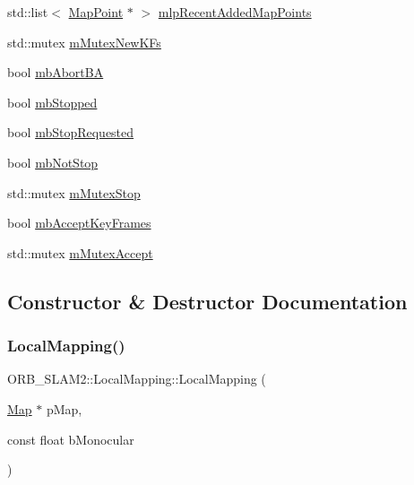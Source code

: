 \begin{DoxyCompactItemize}
\item 
std\+::list$<$ \mbox{\hyperlink{class_o_r_b___s_l_a_m2_1_1_map_point}{Map\+Point}} $\ast$ $>$ \mbox{\hyperlink{class_o_r_b___s_l_a_m2_1_1_local_mapping_afd75991c0499447411a3bd304cc9fa13}{mlp\+Recent\+Added\+Map\+Points}}
\item 
std\+::mutex \mbox{\hyperlink{class_o_r_b___s_l_a_m2_1_1_local_mapping_a970bb666e27d4e801453e9fc26e779a1}{m\+Mutex\+New\+K\+Fs}}
\item 
bool \mbox{\hyperlink{class_o_r_b___s_l_a_m2_1_1_local_mapping_a2d9c44abf1b175880ea418cfc404be87}{mb\+Abort\+BA}}
\item 
bool \mbox{\hyperlink{class_o_r_b___s_l_a_m2_1_1_local_mapping_ada6ab808ccb95293baec4219ac59ca87}{mb\+Stopped}}
\item 
bool \mbox{\hyperlink{class_o_r_b___s_l_a_m2_1_1_local_mapping_af38a9dca4bb96b7ae1711336596a609a}{mb\+Stop\+Requested}}
\item 
bool \mbox{\hyperlink{class_o_r_b___s_l_a_m2_1_1_local_mapping_ad68f6c709f31a5dfca64b24967cc77f2}{mb\+Not\+Stop}}
\item 
std\+::mutex \mbox{\hyperlink{class_o_r_b___s_l_a_m2_1_1_local_mapping_a06f6b4e0e86ca4d311542dec5039d54a}{m\+Mutex\+Stop}}
\item 
bool \mbox{\hyperlink{class_o_r_b___s_l_a_m2_1_1_local_mapping_ade846d251f505560c45d109c348b39e5}{mb\+Accept\+Key\+Frames}}
\item 
std\+::mutex \mbox{\hyperlink{class_o_r_b___s_l_a_m2_1_1_local_mapping_a8668b51cf81fdfde9fd5ee61bd936a19}{m\+Mutex\+Accept}}
\end{DoxyCompactItemize}


\subsection{Constructor \& Destructor Documentation}
\mbox{\label{class_o_r_b___s_l_a_m2_1_1_local_mapping_aa87b27706cc45e36cbb8c7a21c90ed23}} 
\subsubsection{\texorpdfstring{Local\+Mapping()}{LocalMapping()}}
{\footnotesize\ttfamily O\+R\+B\+\_\+\+S\+L\+A\+M2\+::\+Local\+Mapping\+::\+Local\+Mapping (\begin{DoxyParamCaption}\item[{\mbox{\hyperlink{class_o_r_b___s_l_a_m2_1_1_map}{Map}} $\ast$}]{p\+Map,  }\item[{const float}]{b\+Monocular }\end{DoxyParamCaption})}



